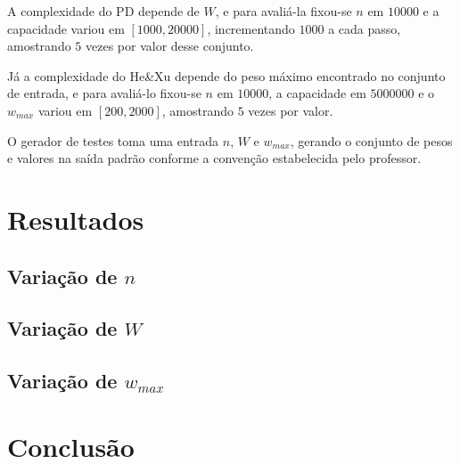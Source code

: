 \documentclass[11pt]{article}
\begin{document}
    A complexidade do PD depende de $W$, e para avaliá-la fixou-se $n$ em $10000$ e a capacidade variou em $[1000, 20000]$, incrementando $1000$ a cada passo, amostrando $5$ vezes por valor desse conjunto.

    Já a complexidade do He\&Xu depende do peso máximo encontrado no conjunto de entrada, e para avaliá-lo fixou-se $n$ em $10000$, a capacidade em $5000000$ e o $w_{max}$ variou em $[200, 2000]$, amostrando $5$ vezes por valor.

    O gerador de testes toma uma entrada $n$, $W$ e $w_{max}$, gerando o conjunto de pesos e valores na saída padrão conforme a convenção estabelecida pelo professor.


    \section{Resultados}

    \subsection{Variação de $n$}

    \subsection{Variação de $W$}

    \subsection{Variação de $w_{max}$}


    \section{Conclusão}
\end{document}
